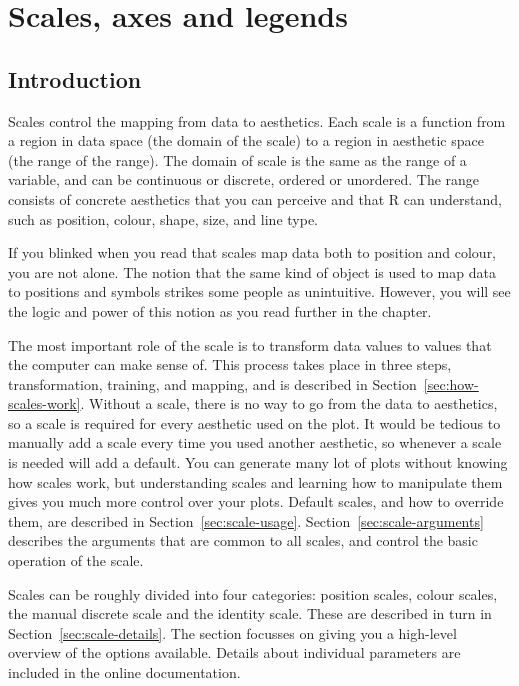 
\chapter{Scales, axes and legends}
\label{cha:scales}

% 


\section{Introduction}

Scales control the mapping from data to aesthetics. Each scale is a function from a region in data space (the domain of the scale) to a region in aesthetic space (the range of the range).  The domain of scale is the same as the range of a variable, and can be continuous or discrete, ordered or unordered.  The range consists of concrete aesthetics that you can perceive and that R can understand, such as position, colour, shape, size, and line type.  


If you blinked when you read that scales map data both to position and colour, you are not alone.  The notion that the same kind of object is used to map data to positions and symbols strikes some people as unintuitive.  However, you will see the logic and power of this notion as you read further in the chapter.

The most important role of the scale is to transform data values to values that the computer can make sense of.  This process takes place in three steps, transformation, training, and mapping, and is described in Section~\ref{sec:how-scales-work}.  Without a scale, there is no way to go from the data to aesthetics, so a scale is required for every aesthetic used on the plot.  It would be tedious to manually add a scale every time you used another aesthetic, so whenever a scale is needed \ggplot will add a default.  You can generate many lot of plots without knowing how scales work, but understanding scales and learning how to manipulate them gives you much more control over your plots.  Default scales, and how to override them, are described in Section~\ref{sec:scale-usage}.  Section~\ref{sec:scale-arguments} describes the arguments that are common to all scales, and control the basic operation of the scale.

Scales can be roughly divided into four categories: position scales, colour scales, the manual discrete scale and the identity scale.  These are described in turn in Section~\ref{sec:scale-details}.  The section focusses on giving you a high-level overview of the options available.  Details about individual parameters are included in the online documentation.

